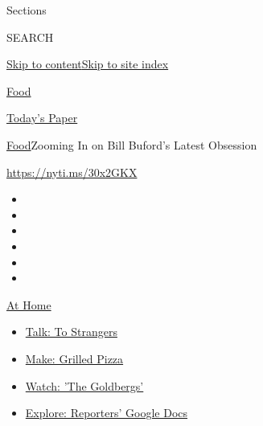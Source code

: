 Sections

SEARCH

\protect\hyperlink{site-content}{Skip to
content}\protect\hyperlink{site-index}{Skip to site index}

\href{https://www.nytimes3xbfgragh.onion/section/food}{Food}

\href{https://myaccount.nytimes3xbfgragh.onion/auth/login?response_type=cookie\&client_id=vi}{}

\href{https://www.nytimes3xbfgragh.onion/section/todayspaper}{Today's
Paper}

\href{/section/food}{Food}\textbar{}Zooming In on Bill Buford's Latest
Obsession

\url{https://nyti.ms/30x2GKX}

\begin{itemize}
\item
\item
\item
\item
\item
\item
\end{itemize}

\href{https://www.nytimes3xbfgragh.onion/spotlight/at-home?action=click\&pgtype=Article\&state=default\&region=TOP_BANNER\&context=at_home_menu}{At
Home}

\begin{itemize}
\tightlist
\item
  \href{https://www.nytimes3xbfgragh.onion/2020/08/03/well/family/the-benefits-of-talking-to-strangers.html?action=click\&pgtype=Article\&state=default\&region=TOP_BANNER\&context=at_home_menu}{Talk:
  To Strangers}
\item
  \href{https://www.nytimes3xbfgragh.onion/2020/08/01/at-home/coronavirus-make-pizza-on-a-grill.html?action=click\&pgtype=Article\&state=default\&region=TOP_BANNER\&context=at_home_menu}{Make:
  Grilled Pizza}
\item
  \href{https://www.nytimes3xbfgragh.onion/2020/07/31/arts/television/goldbergs-abc-stream.html?action=click\&pgtype=Article\&state=default\&region=TOP_BANNER\&context=at_home_menu}{Watch:
  'The Goldbergs'}
\item
  \href{https://www.nytimes3xbfgragh.onion/interactive/2020/at-home/even-more-reporters-editors-diaries-lists-recommendations.html?action=click\&pgtype=Article\&state=default\&region=TOP_BANNER\&context=at_home_menu}{Explore:
  Reporters' Google Docs}
\end{itemize}

